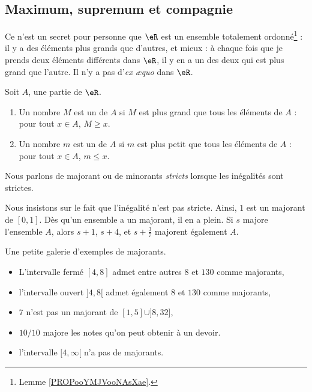 \subsection{Maximum, supremum et compagnie}

Ce n'est un secret pour personne que $\eR$ est un ensemble totalement ordonné\footnote{Lemme \ref{PROPooYMJVooNAsXae}.} : il y a des éléments plus grands que d'autres, et mieux : à chaque fois que je prends deux éléments différents dans $\eR$, il y en a un des deux qui est plus grand que l'autre. Il n'y a pas d'\emph{ex æquo} dans $\eR$.

\begin{definition}
    Soit \( A\), une partie de \( \eR\). 
    \begin{enumerate}
        \item
            Un nombre \( M\) est un  de \( A\) si \( M\) est plus grand que tous les éléments de \( A\) : pour tout \( x\in A\), \( M\geq x\).
        \item
            Un nombre \( m\) est un  de \( A\) si \( m\) est plus petit que tous les éléments de \( A\) : pour tout \( x\in A\), \( m\leq x\).
    \end{enumerate}
    Nous parlons de majorant ou de minorants \emph{stricts} lorsque les inégalités sont strictes.
\end{definition}

Nous insistons sur le fait que l'inégalité n'est pas stricte. Ainsi, $1$ est un majorant de $[0,1]$. Dès qu'un ensemble a un majorant, il en a plein. Si $s$ majore l'ensemble $A$, alors $s+1$, $s+4$, et \( s+\frac{ 3 }{ 7 }\) majorent également $A$.

\begin{example}
Une petite galerie d'exemples de majorants.
\begin{itemize}
\item L'intervalle fermé $[4,8]$ admet entre autres $8$ et $130$ comme majorants,
\item l'intervalle ouvert $]4,8[$ admet également $8$ et $130$ comme majorants,
\item $7$ n'est pas un majorant de $[1,5]\cup]8,32]$,
\item $10/10$ majore les notes qu'on peut obtenir à un devoir.
\item l'intervalle $[4,\infty[$ n'a pas de majorants.
\end{itemize}
\end{example}

